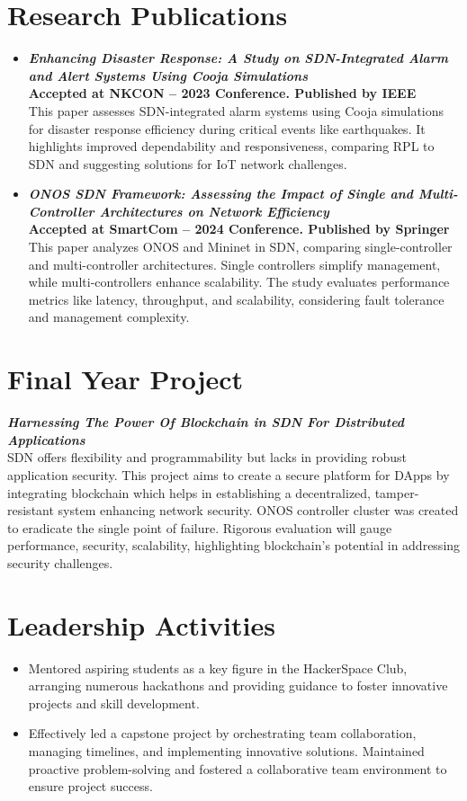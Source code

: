 \documentclass[a4paper,10pt]{article}
\begin{document}
\section*{Research Publications}
\begin{itemize}[leftmargin=*]
   \item \textbf{\textit{Enhancing Disaster Response: A Study on SDN-Integrated Alarm and Alert Systems Using Cooja Simulations}} \\
        \textbf{Accepted at NKCON – 2023 Conference. Published by IEEE} \\
        This paper assesses SDN-integrated alarm systems using Cooja simulations for disaster response efficiency during critical events like earthquakes. It highlights improved dependability and responsiveness, comparing RPL to SDN and suggesting solutions for IoT network challenges.
   \item \textbf{\textit{ONOS SDN Framework: Assessing the Impact of Single and Multi-Controller Architectures on Network Efficiency}} \\
        \textbf{Accepted at SmartCom – 2024 Conference. Published by Springer} \\
        This paper analyzes ONOS and Mininet in SDN, comparing single-controller and multi-controller architectures. Single controllers simplify management, while multi-controllers enhance scalability. The study evaluates performance metrics like latency, throughput, and scalability, considering fault tolerance and management complexity.
\end{itemize}

\section*{Final Year Project}
\textbf{\textit{Harnessing The Power Of Blockchain in SDN For Distributed Applications}} \\
SDN offers flexibility and programmability but lacks in providing robust application security. This project aims to create a secure platform for DApps by integrating blockchain which helps in establishing a decentralized, tamper-resistant system enhancing network security. ONOS controller cluster was created to eradicate the single point of failure. Rigorous evaluation will gauge performance, security, scalability, highlighting blockchain's potential in addressing security challenges.

\section*{Leadership Activities}
\begin{itemize}[leftmargin=*]
   \item Mentored aspiring students as a key figure in the HackerSpace Club, arranging numerous hackathons and providing guidance to foster innovative projects and skill development.
   \item Effectively led a capstone project by orchestrating team collaboration, managing timelines, and implementing innovative solutions. Maintained proactive problem-solving and fostered a collaborative team environment to ensure project success.
\end{itemize}
\end{document}
